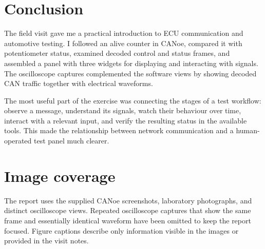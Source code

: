 \documentclass[12pt,a4paper]{article}
\begin{document}
\section{Conclusion}

The field visit gave me a practical introduction to ECU communication and automotive testing. I followed an alive counter in CANoe, compared it with potentiometer status, examined decoded control and status frames, and assembled a panel with three widgets for displaying and interacting with signals. The oscilloscope captures complemented the software views by showing decoded CAN traffic together with electrical waveforms.

The most useful part of the exercise was connecting the stages of a test workflow: observe a message, understand its signals, watch their behaviour over time, interact with a relevant input, and verify the resulting status in the available tools. This made the relationship between network communication and a human-operated test panel much clearer.

\appendix
\section{Image coverage}

The report uses the supplied CANoe screenshots, laboratory photographs, and distinct oscilloscope views. Repeated oscilloscope captures that show the same frame and essentially identical waveform have been omitted to keep the report focused. Figure captions describe only information visible in the images or provided in the visit notes.
\end{document}
